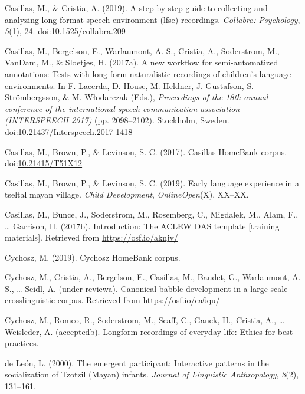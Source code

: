 \documentclass[,man,floatsintext]{apa6}
\begin{document}
\hypertarget{ref-casillas2019stepbystep}{}
Casillas, M., \& Cristia, A. (2019). A step-by-step guide to collecting
and analyzing long-format speech environment (lfse) recordings.
\emph{Collabra: Psychology}, \emph{5}(1), 24.
doi:\href{https://doi.org/10.1525/collabra.209}{10.1525/collabra.209}

\hypertarget{ref-casillas2017workflow}{}
Casillas, M., Bergelson, E., Warlaumont, A. S., Cristia, A., Soderstrom,
M., VanDam, M., \& Sloetjes, H. (2017a). A new workflow for
semi-automatized annotations: Tests with long-form naturalistic
recordings of children's language environments. In F. Lacerda, D. House,
M. Heldner, J. Gustafson, S. Strömbergsson, \& M. Włodarczak (Eds.),
\emph{Proceedings of the 18th annual conference of the international
speech communication association (INTERSPEECH 2017)} (pp. 2098--2102).
Stockholm, Sweden.
doi:\href{https://doi.org/10.21437/Interspeech.2017-1418}{10.21437/Interspeech.2017-1418}

\hypertarget{ref-Casillas-HB}{}
Casillas, M., Brown, P., \& Levinson, S. C. (2017). Casillas HomeBank
corpus. doi:\href{https://doi.org/10.21415/T51X12}{10.21415/T51X12}

\hypertarget{ref-casillas2019early}{}
Casillas, M., Brown, P., \& Levinson, S. C. (2019). Early language
experience in a tseltal mayan village. \emph{Child Development},
\emph{OnlineOpen}(X), XX--XX.

\hypertarget{ref-casillas2017ACLEWDAS}{}
Casillas, M., Bunce, J., Soderstrom, M., Rosemberg, C., Migdalek, M.,
Alam, F., \ldots{} Garrison, H. (2017b). Introduction: The ACLEW DAS
template {[}training materials{]}. Retrieved from
\url{https://osf.io/aknjv/}

\hypertarget{ref-Cychosz-HB}{}
Cychosz, M. (2019). Cychosz HomeBank corpus.

\hypertarget{ref-cychoszURcanonical}{}
Cychosz, M., Cristia, A., Bergelson, E., Casillas, M., Baudet, G.,
Warlaumont, A. S., \ldots{} Seidl, A. (under reviewa). Canonical babble
development in a large-scale crosslinguistic corpus. Retrieved from
\url{https://osf.io/ca6qu/}

\hypertarget{ref-cychoszURlongform}{}
Cychosz, M., Romeo, R., Soderstrom, M., Scaff, C., Ganek, H., Cristia,
A., \ldots{} Weisleder, A. (acceptedb). Longform recordings of everyday
life: Ethics for best practices.

\hypertarget{ref-deleon2000emergent}{}
de León, L. (2000). The emergent participant: Interactive patterns in
the socialization of Tzotzil (Mayan) infants. \emph{Journal of
Linguistic Anthropology}, \emph{8}(2), 131--161.
\end{document}
